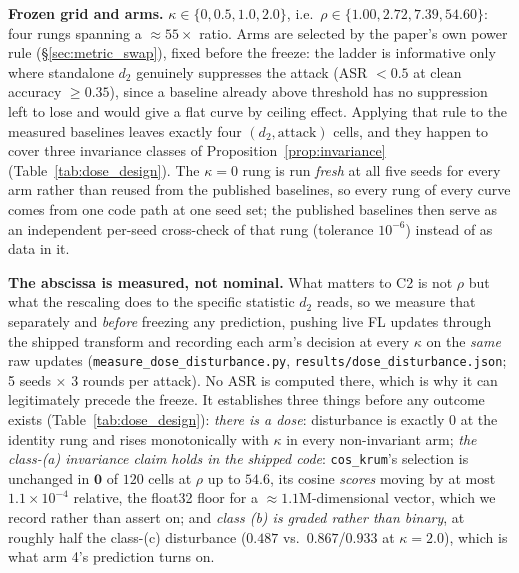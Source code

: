 \documentclass{article}
\begin{document}
\textbf{Frozen grid and arms.} $\kappa \in \{0, 0.5, 1.0, 2.0\}$, i.e.\ $\rho \in \{1.00, 2.72, 7.39, 54.60\}$: four rungs spanning a ${\approx}55\times$ ratio. Arms are selected by the paper's own power rule (§\ref{sec:metric_swap}), fixed before the freeze: the ladder is informative only where standalone $d_2$ genuinely suppresses the attack (ASR $<0.5$ at clean accuracy $\ge 0.35$), since a baseline already above threshold has no suppression left to lose and would give a flat curve by ceiling effect. Applying that rule to the measured baselines leaves exactly four $(d_2, \text{attack})$ cells, and they happen to cover three invariance classes of Proposition~\ref{prop:invariance} (Table~\ref{tab:dose_design}). The $\kappa{=}0$ rung is run \emph{fresh} at all five seeds for every arm rather than reused from the published baselines, so every rung of every curve comes from one code path at one seed set; the published baselines then serve as an independent per-seed cross-check of that rung (tolerance $10^{-6}$) instead of as data in it.

\textbf{The abscissa is measured, not nominal.} What matters to C2 is not $\rho$ but what the rescaling does to the specific statistic $d_2$ reads, so we measure that separately and \emph{before} freezing any prediction, pushing live FL updates through the shipped transform and recording each arm's decision at every $\kappa$ on the \emph{same} raw updates (\texttt{measure\_dose\_disturbance.py}, \texttt{results/dose\_disturbance.json}; 5 seeds $\times$ 3 rounds per attack). No ASR is computed there, which is why it can legitimately precede the freeze. It establishes three things before any outcome exists (Table~\ref{tab:dose_design}): \emph{there is a dose}: disturbance is exactly $0$ at the identity rung and rises monotonically with $\kappa$ in every non-invariant arm; \emph{the class-(a) invariance claim holds in the shipped code}: \texttt{cos\_krum}'s selection is unchanged in $\mathbf{0}$ of $120$ cells at $\rho$ up to $54.6$, its cosine \emph{scores} moving by at most $1.1\times10^{-4}$ relative, the float32 floor for a ${\approx}1.1$M-dimensional vector, which we record rather than assert on; and \emph{class (b) is graded rather than binary}, at roughly half the class-(c) disturbance ($0.487$ vs.\ $0.867$/$0.933$ at $\kappa{=}2.0$), which is what arm 4's prediction turns on.
\end{document}
